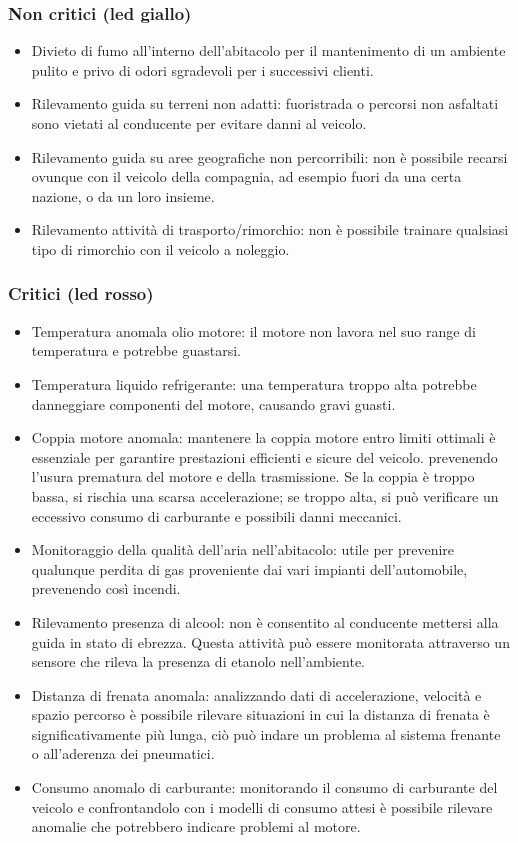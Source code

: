 \documentclass[12pt, a4paper, italian]{report}
\numberwithin{figure}{chapter}
\numberwithin{table}{chapter}
\begin{document}
\subsubsection{Non critici (led giallo)}

\begin{itemize}
    \item Divieto di fumo all'interno dell'abitacolo per il mantenimento di un ambiente pulito e privo di odori sgradevoli per i successivi clienti.
    \item Rilevamento guida su terreni non adatti: fuoristrada o percorsi non asfaltati sono vietati al conducente per evitare danni al veicolo. 
    \item Rilevamento guida su aree geografiche non percorribili: non è possibile recarsi ovunque con il veicolo della compagnia, ad esempio fuori da una certa nazione, o da un loro insieme.
    \item Rilevamento attività di trasporto/rimorchio: non è possibile trainare qualsiasi tipo di rimorchio con il veicolo a noleggio.
\end{itemize}

\subsubsection{Critici (led rosso)}

\begin{itemize}
    \item Temperatura anomala olio motore: il motore non lavora nel suo range di    temperatura e potrebbe guastarsi.
    \item Temperatura liquido refrigerante: una temperatura troppo alta potrebbe danneggiare componenti del motore, causando gravi guasti.
    \item Coppia motore anomala: mantenere la coppia motore entro limiti ottimali è essenziale per garantire prestazioni efficienti e sicure del veicolo. prevenendo l'usura prematura del motore e della trasmissione. Se la coppia è troppo bassa, si rischia una scarsa accelerazione; se troppo alta, si può verificare un eccessivo consumo di carburante e possibili danni meccanici.
    \item Monitoraggio della qualità dell'aria nell'abitacolo: utile per prevenire qualunque perdita di gas proveniente dai vari impianti dell'automobile, prevenendo così incendi.
    \item Rilevamento presenza di alcool: non è consentito al conducente mettersi alla guida in stato di ebrezza. Questa attività può essere monitorata attraverso un sensore che rileva la presenza di etanolo nell'ambiente. \cite{ahmar2021road}
    \item Distanza di frenata anomala: analizzando dati di accelerazione, velocità e spazio percorso è possibile rilevare situazioni in cui la distanza di frenata è significativamente più lunga, ciò può indare un problema al sistema frenante o all'aderenza dei pneumatici.
    \item Consumo anomalo di carburante: monitorando il consumo di carburante del veicolo e confrontandolo con i modelli di consumo attesi è possibile rilevare anomalie che potrebbero indicare problemi al motore.
\end{itemize}
\end{document}
